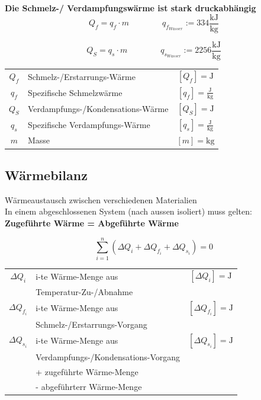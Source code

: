 \textbf{Die Schmelz-/ Verdampfungswärme ist stark druckabhängig} \\


$$ \boxed{ Q_f = q_f \cdot m } \qquad \qquad q_{f_{Wasser}} := 334 \mathrm{\frac{kJ}{kg}} $$

$$ \boxed{ Q_S = q_s \cdot m } \qquad \qquad q_{s_{Wasser}} := 2256 \mathrm{\frac{kJ}{kg} } $$



\begin{tabular}{c l c}

	$Q_f$ & Schmelz-/Erstarrungs-Wärme & $[Q_f] = \mathrm{J}$ \\
	\rule{0pt}{8pt}$q_f$ & Spezifische Schmelzwärme & $[q_f] = \mathrm{\frac{J}{kg}}$ \\
	$Q_S$ & Verdampfungs-/Kondensations-Wärme & $[Q_S] = \mathrm{J}$ \\
	\rule{0pt}{8pt}$q_s$ & Spezifische Verdampfungs-Wärme& $[q_s] = \mathrm{\frac{J}{kg}}$ \\
	$m$ & Masse & $[m] = \mathrm{kg}$ \\
\end{tabular}




\vfill\null
\columnbreak



\subsection{Wärmebilanz}
Wärmeaustausch zwischen verschiedenen Materialien \\

In einem abgeschlossenen System (nach aussen isoliert) muss gelten: \\
\textbf{Zugeführte Wärme = Abgeführte Wärme}

$$  \boxed{ \sum_{i=1}^n  ( \Delta Q_i + \Delta Q_{f_i} + \Delta Q_{s_i} ) = 0 } $$


\begin{tabular}{c l c}
	$\Delta Q_i$ & i-te Wärme-Menge aus & $[\Delta Q_i] = \mathrm{J}$ \\
				& Temperatur-Zu-/Abnahme & \\
	$\Delta Q_{f_i}$ & i-te Wärme-Menge aus  &  $[\Delta Q_{f_i}] = \mathrm{J}$ \\
				& Schmelz-/Erstarrungs-Vorgang  & \\
	$\Delta Q_{s_i}$ & i-te Wärme-Menge aus & $[\Delta Q_{s_i}] = \mathrm{J}$\\
					 & Verdampfungs-/Kondensations-Vorgang &  \\
	& +  zugeführte Wärme-Menge &  \\
	& - abgeführterr Wärme-Menge & \\
\end{tabular}




